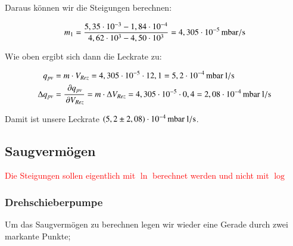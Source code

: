 Daraus können wir die Steigungen berechnen:

\begin{align*}
m_1 &= \frac{5,35 \cdot 10^{-3} - 1,84 \cdot 10^{-4}}{4,62 \cdot 10^{3} - 4,50 \cdot 10^{3}} = \unit[4,305 \cdot 10^{-5}]{mbar/s} \\
\end{align*}

Wie oben ergibt sich dann die Leckrate zu:

\begin{align*}
q_{pv} &= m \cdot V_{Rez} = 4,305 \cdot 10^{-5} \cdot 12,1 = \unit[5,2 \cdot 10^{-4}]{mbar \ l/s} \\
\Delta q_{pv} &= \frac{\p q_{pv}}{\p V_{Rez}} = m \cdot \Delta V_{Rez} = 4,305 \cdot 10^{-5} \cdot 0,4 = \unit[2,08 \cdot 10^{-4}]{mbar \ l/s}
\end{align*}

Damit ist unsere Leckrate $\unit[(5,2 \pm 2,08) \cdot 10^{-4}]{mbar \ l/s}$.




\subsection*{Saugvermögen}


\textcolor{red}{Die Steigungen sollen eigentlich mit $\ln$ berechnet werden und nicht mit $\log$}



\subsubsection*{Drehschieberpumpe}

Um das Saugvermögen zu berechnen legen wir wieder eine Gerade durch zwei markante Punkte;

\begin{figure}[h]
\end{figure}

